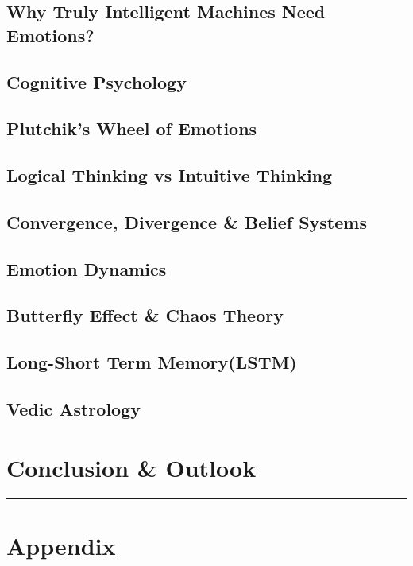 \documentclass[12pt, a4paper, twoside]{article}
\begin{document}
	\subsection{Why Truly Intelligent Machines Need Emotions?}
	
	\subsection{Cognitive Psychology}
	
	\subsection{Plutchik's Wheel of Emotions}
	
	\subsection{Logical Thinking vs Intuitive Thinking}
	
	\subsection{Convergence, Divergence \& Belief Systems}
	
	\subsection{Emotion Dynamics}
	
	\subsection{Butterfly Effect \& Chaos Theory}
	
	\subsection{Long-Short Term Memory(LSTM)}
	
	\subsection{Vedic Astrology}
	
	\section{Conclusion \& Outlook}
	
	\hrule
	
	
	\section*{Appendix}
	\appendix
	
\end{document}
